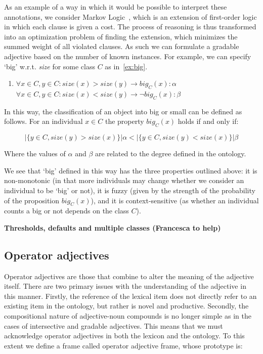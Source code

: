 \documentclass[11pt]{article}
\begin{document}
As an example of a way in which it would be possible to interpret these 
annotations, we consider Markov Logic~\cite{richardson2006markov}, which is an 
extension of first-order logic in which each clause is given a cost. The process 
of reasoning is thus transformed into an optimization problem of finding the 
extension, which minimizes the summed weight of all violated clauses. As such we
can formulate a gradable adjective based on the number of known instances. 
For example, we can specify `big' w.r.t. \emph{size} for some class $C$ as in~\ref{ex:big}.
%
\begin{enumerate}[resume]
\item $\forall x \in C, y \in C : size(x) > size(y) \rightarrow big_C(x) : \alpha$ \\
$\forall x \in C, y \in C : size(x) < size(y) \rightarrow \neg big_C(x) : \beta$
\label{ex:big}
\end{enumerate}
%
In this way, the classification of an object into big or small can be defined as follows.
For an individual $x \in C$ the property $big_C(x)$ holds if and only if: 

$$|\{y \in C, size(y) > size(x)\}| \alpha < |\{y \in C, size(y) < size(x)\}| \beta$$

Where the values of $\alpha$ and $\beta$ are related to the degree defined
in the ontology.

We see that `big' defined in this way has the three properties outlined above: 
it is non-monotonic (in that more individuals may change whether we consider an individual 
to be `big' or not), it is fuzzy (given by the strength of the probability of the proposition $big_C(x)$), 
and it is context-sensitive (as whether an individual counts a big or not depends on the class $C$).

\textbf{Thresholds, defaults and multiple classes (Francesca to help)}

\subsection{Operator adjectives}

Operator adjectives are those that combine to alter the meaning of the adjective itself. 
There are two primary issues with the understanding of the adjective in this manner. 
Firstly, the reference of the lexical item does not directly refer to an existing item 
in the ontology, but rather is novel and productive. Secondly, the compositional nature 
of adjective-noun compounds is no longer simple as in the cases of intersective and gradable adjectives. 
This means that we must acknowledge operator adjectives in both the lexicon and the ontology. 
To this extent we define a frame called operator adjective frame, whose prototype is:
\end{document}
